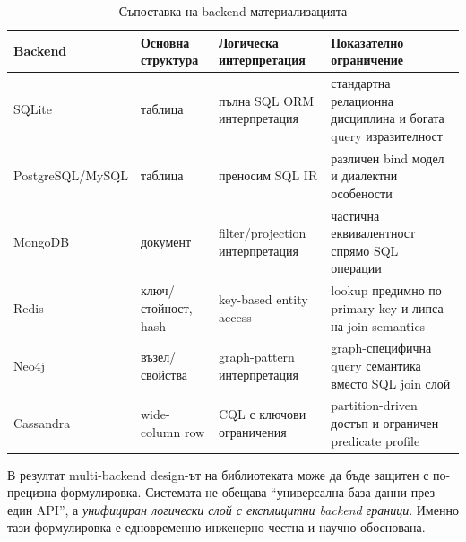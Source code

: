 \begin{table}[H]
\centering
\small
\caption{Съпоставка на backend материализацията}
\label{tab:backend_materialisation}
\begin{tabularx}{\textwidth}{L{2.0cm}L{2.5cm}L{2.8cm}Y}
\toprule
\textbf{Backend} & \textbf{Основна структура} & \textbf{Логическа интерпретация} & \textbf{Показателно ограничение} \\
\midrule
SQLite & таблица & пълна SQL ORM интерпретация & стандартна релационна дисциплина и богата query изразителност \\
PostgreSQL/MySQL & таблица & преносим SQL IR & различен bind модел и диалектни особености \\
MongoDB & документ & filter/projection интерпретация & частична еквивалентност спрямо SQL операции \\
Redis & ключ/стойност, hash & key-based entity access & lookup предимно по primary key и липса на join semantics \\
Neo4j & възел/свойства & graph-pattern интерпретация & graph-специфична query семантика вместо SQL join слой \\
Cassandra & wide-column row & CQL с ключови ограничения & partition-driven достъп и ограничен predicate profile \\
\bottomrule
\end{tabularx}
\end{table}

В резултат multi-backend design-ът на библиотеката може да бъде защитен с по-прецизна формулировка. Системата не обещава ``универсална база данни през един API'', а \emph{унифициран логически слой с експлицитни backend граници}. Именно тази формулировка е едновременно инженерно честна и научно обоснована.
